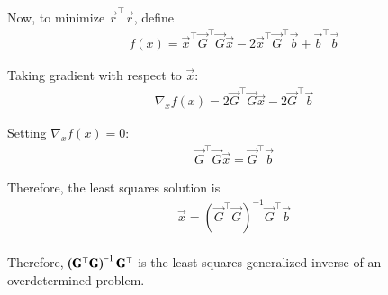 \documentclass[journal]{IEEEtran}
\begin{document}
Now, to minimize \(\vec{r}^{\top}\vec{r}\), define
\begin{align}
f(x) = \vec{x}^{\top}\vec{G}^{\top}\vec{G}\vec{x} - 2\vec{x}^{\top}\vec{G}^{\top}\vec{b} + \vec{b} ^{\top}\vec{b} 
\end{align}

Taking gradient with respect to \(\vec{x}\):
\begin{align}
\nabla_x f(x) = 2\vec{G}^{\top}\vec{G}\vec{x} - 2\vec{G}^{\top}\vec{b} 
\end{align}

Setting \(\nabla_x f(x) = 0\):
\begin{align}
\vec{G}^{\top}\vec{G}\vec{x} = \vec{G}^{\top}\vec{b} 
\end{align}

Therefore, the least squares solution is
\begin{align}
\vec{x} = \boxed{(\vec{G}^{\top}\vec{G})^{-1}\vec{G}^{\top}\vec{b} }
\end{align}\\
Therefore, $\left(\mathbf{G}^{\top}\mathbf{G}\right)^{-1}\mathbf{G}^{\top}$ is the least squares generalized inverse of an overdetermined problem.
\end{document}
